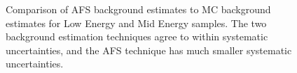 \begin{figure}
	\centering
	\caption{Comparison of AFS background estimates to MC background estimates for Low Energy and Mid Energy samples.  The two background estimation techniques agree to within systematic uncertainties, and the AFS technique has much smaller systematic uncertainties.}
	\label{fig:bckg_comparison}

\end{figure}



